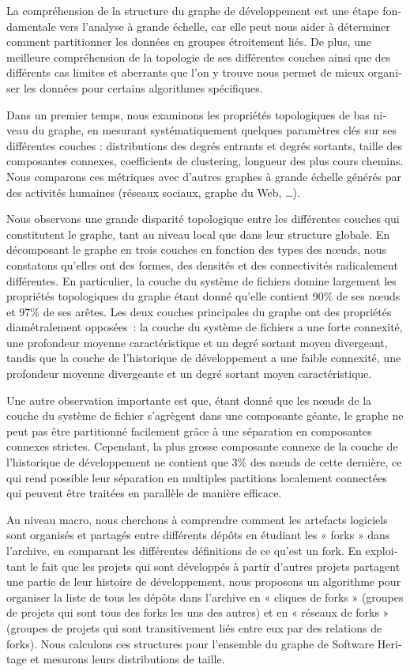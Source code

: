\begin{otherlanguage}{french}
La compréhension de la structure du graphe de développement est une étape
fondamentale vers l'analyse à grande échelle, car elle peut nous aider à
déterminer comment partitionner les données en groupes étroitement liés. De
plus, une meilleure compréhension de la topologie de ses différentes couches
ainsi que des différents cas limites et aberrants que l'on y trouve nous permet
de mieux organiser les données pour certains algorithmes spécifiques.

Dans un premier temps, nous examinons les propriétés topologiques de bas niveau
du graphe, en mesurant systématiquement quelques paramètres clés sur ses
différentes couches : distributions des degrés entrants et degrés sortants,
taille des composantes connexes, coefficients de clustering, longueur des plus
cours chemins. Nous comparons ces métriques avec d'autres graphes à grande
échelle générés par des activités humaines (réseaux sociaux, graphe du Web,
\ldots).

Nous observons une grande disparité topologique entre les différentes couches
qui constitutent le graphe, tant au niveau local que dans leur structure
globale. En décomposant le graphe en trois couches en fonction des types des
nœuds, nous constatons qu'elles ont des formes, des densités et des
connectivités radicalement différentes. En particulier, la couche du système de
fichiers domine largement les propriétés topologiques du graphe étant donné
qu'elle contient 90\% de ses nœuds et 97\% de ses arêtes. Les deux couches
principales du graphe ont des propriétés diamétralement opposées~: la couche du
système de fichiers a une forte connexité, une profondeur moyenne
caractéristique et un degré sortant moyen divergeant, tandis que la couche de
l'historique de développement a une faible connexité, une profondeur moyenne
divergeante et un degré sortant moyen caractéristique.

Une autre observation importante est que, étant donné que les nœuds de la
couche du système de fichier s'agrègent dans une composante géante, le graphe
ne peut pas être partitionné facilement grâce à une séparation en composantes
connexes strictes. Cependant, la plus grosse composante connexe de la couche de
l'historique de développement ne contient que 3\% des nœuds de cette dernière,
ce qui rend possible leur séparation en multiples partitions localement
connectées qui peuvent être traitées en parallèle de manière efficace.

Au niveau macro, nous cherchons à comprendre comment les artefacts logiciels
sont organisés et partagés entre différents dépôts en étudiant les « forks »
dans l'archive, en comparant les différentes définitions de ce qu'est un fork.
En exploitant le fait que les projets qui sont développés à partir d'autres
projets partagent une partie de leur histoire de développement, nous proposons
un algorithme pour organiser la liste de tous les dépôts dans l'archive en «
cliques de forks » (groupes de projets qui sont tous des forks les uns des
autres) et en « réseaux de forks » (groupes de projets qui sont transitivement
liés entre eux par des relations de forks). Nous calculons ces structures pour
l'ensemble du graphe de Software Heritage et mesurons leurs distributions de
taille.


\end{otherlanguage}
